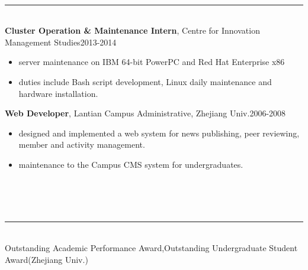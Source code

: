 \documentclass[10pt,oneside,letter,final]{article}
\newenvironment{CVsection}[1]{
    \hspace*{20pt}{\bf \Large #1}\\[-3pt]
    \rule[5pt]{\textwidth}{1pt}\\
}{
    \hspace{-10pt}\hfill\\[10pt]
}
\newenvironment{CVexperience}[3]{
    {\bf #1}, #2\hfill #3\\[2pt]
    \begin{itemize}
        \setlength{\parsep}{0pt}
        \setlength{\itemsep}{0pt}\vspace{-16pt}
}{
    \end{itemize}
}
\begin{document}
    \begin{CVsection}{\Large I\large NTERNSHIPS}
        \begin{CVexperience}{Cluster Operation \& Maintenance Intern}{Centre for Innovation Management Studies}{2013-2014}
            \item server maintenance on IBM 64-bit PowerPC and Red Hat Enterprise x86
			\item duties include Bash script development, Linux daily maintenance and hardware installation.
        \end{CVexperience}
        
        \begin{CVexperience}{Web Developer}{Lantian Campus Administrative, Zhejiang Univ.}{2006-2008}
            \item designed and implemented a web system for news publishing, peer reviewing, member and activity management.
            \item maintenance to the Campus CMS system for undergraduates.
        \end{CVexperience}

    \end{CVsection}
    \\[-20pt]
    \begin{CVsection}{\Large H\large ONORS}
        Outstanding Academic Performance Award,\quad Outstanding Undergraduate Student Award\hfill (Zhejiang Univ.)
    \end{CVsection}
\end{document}
